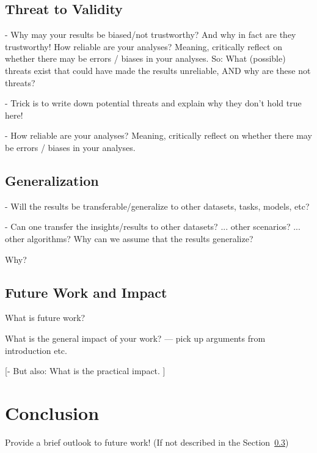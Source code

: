 \documentclass[sigconf, review, nonacm]{acmart}
\begin{document}
\subsection{Threat to Validity}
\label{sec:threattovalidity}

- Why may your results be biased/not trustworthy? And why in fact are they trustworthy! How reliable are your analyses? Meaning, critically reflect on whether there may be errors / biases in your analyses. So: What (possible) threats exist that could have made the results unreliable, AND why are these not threats?

- Trick is to write down potential threats and explain why they don't hold true here!

- How reliable are your analyses? Meaning, critically reflect on whether there may be errors / biases in your analyses.

\subsection{Generalization}
\label{sec:generalization}

- Will the results be transferable/generalize to other datasets, tasks, models, etc?

- Can one transfer the insights/results to other datasets? ... other scenarios? ... other algorithms? Why can we assume that the results generalize?

Why?

\subsection{Future Work and Impact}
\label{sec:futurework}

What is future work?

What is the general impact of your work?
--- pick up arguments from introduction etc.

[- But also: What is the practical impact. ]



\section{Conclusion}
\label{sec:conclusion}


Provide a brief outlook to future work! (If not described in the Section~\ref{sec:futurework})
\end{document}
